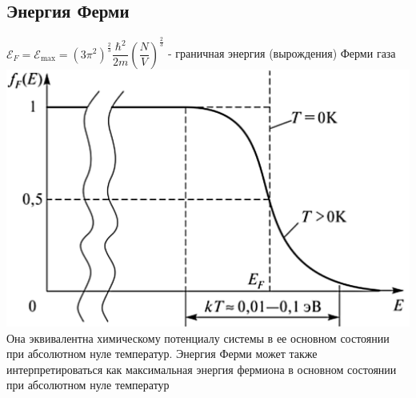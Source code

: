 \begin{multicols*}{2}
		\section{Энергия Ферми}
		${\mathcal{E}}_F = {\mathcal{E}}_{\text{max}} = \left(3 \pi^2\right)^{\frac{2}{3}} \dfrac{\hbar^2}{2m} \left(\dfrac{N}{V}\right)^{\frac{2}{3}}$ - граничная энергия (вырождения) Ферми газа\\
		\includegraphics[width=0.4\linewidth]{td_imgs/fermi.png} \\
		Она эквивалентна химическому потенциалу системы в ее основном состоянии при абсолютном нуле температур. Энергия Ферми может также интерпретироваться как максимальная энергия фермиона в основном состоянии при абсолютном нуле температур

	\end{multicols*}

